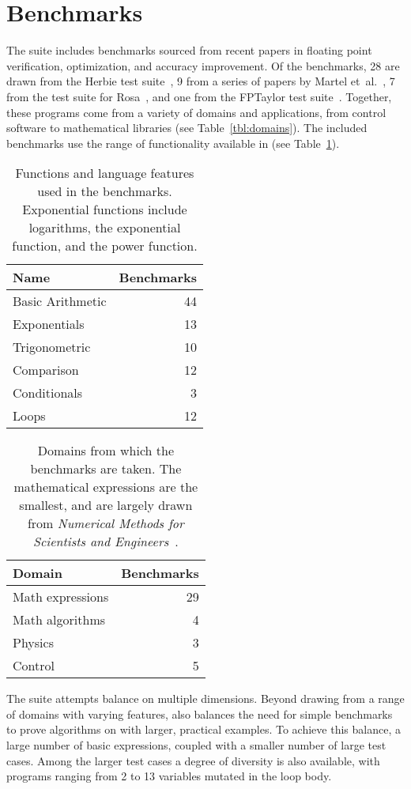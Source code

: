 \documentclass[main.tex]{subfiles}
\begin{document}
\section{Benchmarks}
\label{sec:benchmarks}

The \name suite includes \nbenches benchmarks
  sourced from recent papers in floating point verification,
  optimization, and accuracy improvement.
Of the benchmarks,
  28 are drawn from the Herbie test suite~\cite{pavel15},
  9 from a series of papers by Martel et~al.~\cite{fmics15},
  7 from the test suite for Rosa~\cite{DarulovaK14},
  and one from the FPTaylor test suite~\cite{fptaylor-fm15}.
Together, these programs come from
  a variety of domains and applications,
  from control software to mathematical libraries
  (see Table~\ref{tbl:domains}).
The included benchmarks use the range of functionality
  available in \name (see Table~\ref{tbl:features}).

\begin{table}[hbtp]
  \begin{tabular}{lr}
    Name & Benchmarks \\\hline
    Basic Arithmetic & 44 \\
    Exponentials & 13 \\
    Trigonometric & 10 \\
    Comparison & 12 \\
    Conditionals & 3 \\
    Loops & 12
  \end{tabular}
  \caption{Functions and language features used in the \name
    benchmarks. Exponential functions include logarithms, the
    exponential function, and the power function.}
  \label{tbl:features}
\end{table}

\begin{table}[hbtp]
  \begin{tabular}{lr}
    Domain & Benchmarks \\\hline
    Math expressions & 29 \\
    Math algorithms & 4 \\
    Physics & 3 \\
    Control & 5 \\
  \end{tabular}
  \caption{Domains from which the \name benchmarks are taken. The
    mathematical expressions are the smallest, and are largely
    drawn from \textit{Numerical Methods for Scientists and
      Engineers}~\cite{hamming-1987}.}
\end{table}

The \name suite attempts balance on multiple dimensions.
Beyond drawing from a range of domains with varying features,
  \name also balances the need for simple benchmarks
  to prove algorithms on
  with larger, practical examples.
To achieve this balance,
  a large number of basic expressions,
  coupled with a smaller number of large test cases.
Among the larger test cases a degree of diversity is also available,
  with programs ranging
  from 2 to 13 variables mutated in the loop body.
\end{document}
